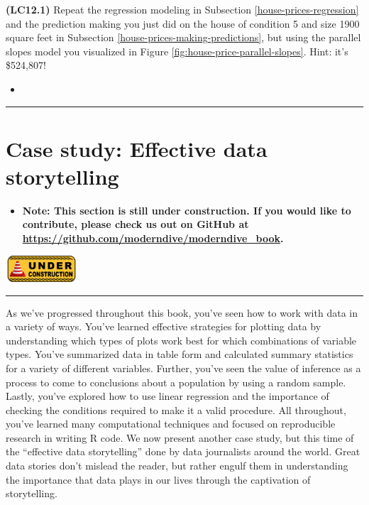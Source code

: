 \documentclass[12pt, krantz2,]{krantz}
\newenvironment{rmdblock}[1]
  {\begin{shaded*}
  \begin{itemize}
  \renewcommand{\labelitemi}{
    \raisebox{-.7\height}[0pt][0pt]{
    }
  }
  \item
  }
  {
  \end{itemize}
  \end{shaded*}
  }
\newenvironment{learncheck}
  {\begin{rmdblock}{warning}}
  {\end{rmdblock}}
\begin{document}
\textbf{(LC12.1)} Repeat the regression modeling in Subsection \ref{house-prices-regression} and the prediction making you just did on the house of condition 5 and size 1900 square feet in Subsection \ref{house-prices-making-predictions}, but using the parallel slopes model you visualized in Figure \ref{fig:house-price-parallel-slopes}. Hint: it's \$524,807!

\begin{learncheck}

\end{learncheck}

\begin{center}\rule{0.5\linewidth}{\linethickness}\end{center}

\hypertarget{data-journalism}{%
\section{Case study: Effective data storytelling}\label{data-journalism}}

\begin{learncheck}
\textbf{Note: This section is still under construction. If you would
like to contribute, please check us out on GitHub at
\url{https://github.com/moderndive/moderndive_book}.}
\end{learncheck}

\includegraphics[width=0.2\textwidth,height=\textheight]{images/sign-2408065_1920.png}

\begin{center}\rule{0.5\linewidth}{\linethickness}\end{center}

As we've progressed throughout this book, you've seen how to work with data in a variety of ways. You've learned effective strategies for plotting data by understanding which types of plots work best for which combinations of variable types. You've summarized data in table form and calculated summary statistics for a variety of different variables. Further, you've seen the value of inference as a process to come to conclusions about a population by using a random sample. Lastly, you've explored how to use linear regression and the importance of checking the conditions required to make it a valid procedure. All throughout, you've learned many computational techniques and focused on reproducible research in writing R code. We now present another case study, but this time of the ``effective data storytelling'' done by data journalists around the world. Great data stories don't mislead the reader, but rather engulf them in understanding the importance that data plays in our lives through the captivation of storytelling.
\end{document}
